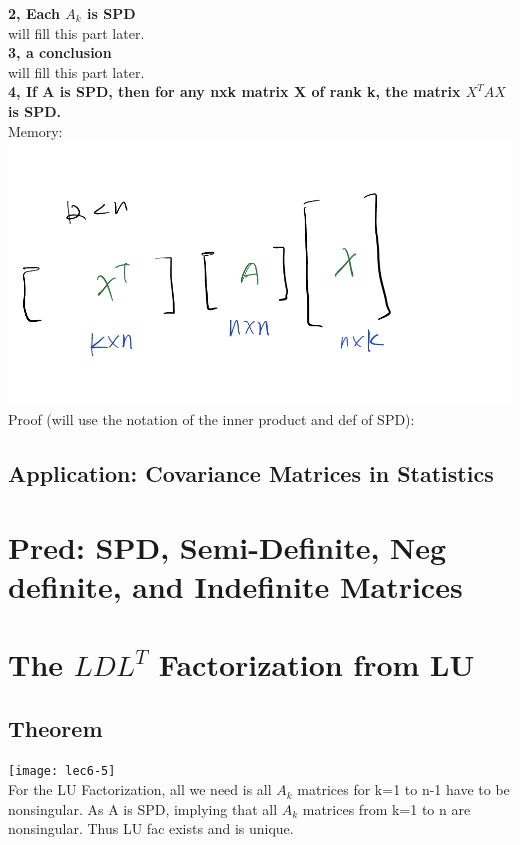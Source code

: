\documentclass{article}
\begin{document}
\noindent
\textbf{2, Each $A_k$ is SPD}\\
will fill this part later.\\

\noindent
\textbf{3, a conclusion}\\
will fill this part later.\\


\noindent
\textbf{4, If A is SPD, then for any nxk matrix X of rank k, the matrix $X^TAX$ is SPD.}\\
Memory:\\
\includegraphics[width=1\linewidth]{lec6-1.jpg}
Proof (will use the notation of the inner product and def of SPD):\\




\subsection*{Application: Covariance Matrices in Statistics}

\pagebreak
\section{Pred: SPD, Semi-Definite, Neg definite, and Indefinite Matrices}


\pagebreak
\section{The $LDL^T$ Factorization from LU}
\subsection*{Theorem}
\texttt{[image: lec6-5]}\\

\noindent
For the LU Factorization, all we need is all $A_k$ matrices for k=1 to n-1 have to
be nonsingular. As A is SPD, implying that all $A_k$ matrices from k=1 to n are nonsingular.
Thus LU fac exists and is unique.\\
\end{document}
